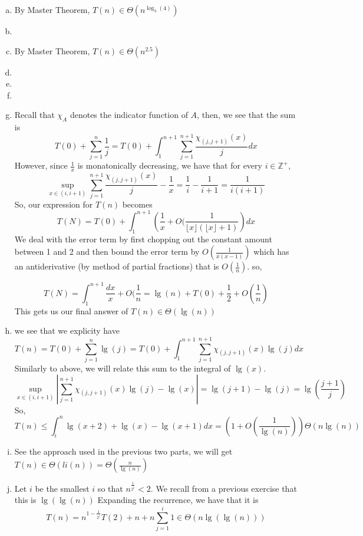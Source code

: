 \documentclass{article}
\begin{document}
\begin{enumerate}[a)]
\item
By Master Theorem, $T(n) \in \Theta(n^{\log_3(4)})$

\item

\item
By Master Theorem, $T(n) \in \Theta(n^{2.5})$


\item

\item

\item

\item
Recall that $\chi_A$ denotes the indicator function of $A$, then, we see that the sum is
\[
T(0) + \sum_{j=1}^{n} \frac{1}{j} = T(0) + \int_{1}^{n+1} \sum_{j=1}^{n+1} \frac{\chi_{(j,j+1)}(x)}{j} dx 
\]
However, since $\frac{1}{x}$ is monatonically decreasing, we have that for every $i\in \mathbb{Z}^+$,
\[
\sup_{x\in (i,i+1)}  \sum_{j=1}^{n+1} \frac{\chi_{(j,j+1)}(x)}{j}  - \frac{1}{x} = \frac{1}{i}  - \frac{1}{i+1} = \frac{1}{i(i+1)}
\]
So, our expression for $T(n)$ becomes
\[
T(N) = T(0)+ \int_1^{n+1} \left(\frac{1}{x} + O(\frac{1}{\lfloor x\rfloor(\lfloor x\rfloor+1)}\right)dx
\]
We deal with the error term by first chopping out the constant amount between 1 and 2 and then bound the error term by $O(\frac{1}{x(x-1)})$ which has an antiderivative (by method of partial fractions) that is $O(\frac{1}{n})$. so,

\[
T(N) = \int_1^{n+1} \frac{dx}{x} + O(\frac{1}{n} = \lg(n) + T(0) + \frac{1}{2} + O(\frac{1}{n})
\]
This gets us our final answer of $T(n) \in \Theta(\lg(n))$
\item
we see that we explicity have
\[
T(n) = T(0) +\sum_{j=1}^n \lg(j) = T(0) + \int_1^{n+1} \sum_{j=1}^{n+1} \chi_{(j,j+1)}(x)\lg(j) dx 
\]
Similarly to above, we will relate this sum to the integral of $\lg(x)$. 
\[
\sup_{x\in (i,i+1)}  \left|\sum_{j=1}^{n+1} \chi_{(j,j+1)}(x)\lg(j)  - \lg(x)\right| = \lg(j+1) - \lg(j) = \lg\left(\frac{j+1}{j}\right)
\]
So, 
\[
T(n) \le \int_{i}^n \lg(x+2) + \lg(x) - \lg(x+1) dx  = (1  + O(\frac{1}{\lg(n)}))\Theta(n\lg(n))
\]
\item
See the approach used in the previous two parts, we will get $T(n) \in \Theta(li(n))= \Theta( \frac{n}{\lg(n)})$
\item
Let $i$ be the smallest $i$ so that $n^{\frac{1}{2^i}}<2$. We recall from a previous exercise that this is $\lg(\lg(n))$ Expanding the recurrence, we have that it is 
\[
T(n) = n^{1 - \frac{1}{2^i}} T(2) + n + n \sum_{j=1}^i 1 \in \Theta(n\lg(\lg(n)))
\]

\end{enumerate}
\end{document}
